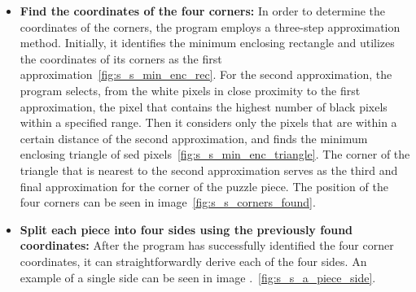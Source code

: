 \documentclass{article}
\begin{document}
\begin{itemize}
  \item \textbf{Find the coordinates of the four corners:}\newline
  In order to determine the coordinates of the corners,
  the program employs a three-step approximation method.
  Initially, it identifies the minimum enclosing rectangle and
  utilizes the coordinates of its corners
  as the first approximation~\cref{fig:s_s_min_enc_rec}.\newline
  For the second approximation, the program selects,
  from the white pixels in close proximity to the first approximation,
  the pixel that contains the highest number of black pixels
  within a specified range.
  Then it considers only the pixels that are within a certain
  distance of the second approximation, and finds the minimum
  enclosing triangle of sed pixels~\cref{fig:s_s_min_enc_triangle}.\newline
  The corner of the triangle that is nearest to the second
  approximation serves as the third and final approximation
  for the corner of the puzzle piece.
  The position of the four corners can be seen in image~\cref{fig:s_s_corners_found}.

  \item \textbf{Split each piece into four sides using the previously found coordinates:}\newline
	After the program has successfully identified the four corner coordinates,
  it can straightforwardly derive each of the four sides.
  An example of a single side can be seen in image .~\cref{fig:s_s_a_piece_side}.
\end{itemize}
\end{document}
